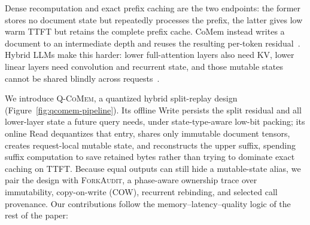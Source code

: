 \documentclass{article}
\newcommand{\qcomem}{\textsc{Q-CoMem}}
\newcommand{\method}{\textsc{ForkAudit}}
\begin{document}
Dense recomputation and exact prefix caching are the two endpoints: the former
stores no document state but repeatedly processes the prefix, the latter gives
low warm TTFT but retains the complete prefix cache.  CoMem instead writes a
document to an intermediate depth and reuses the resulting per-token
residual~\citep{liu2026comem,liu2026understanding}.  Hybrid LLMs make this
harder: lower full-attention layers also need KV, lower linear layers need
convolution and recurrent state, and those mutable states cannot be shared
blindly across requests~\citep{yang2025gateddeltanet,lieber2025jamba}.

We introduce \qcomem{}, a quantized hybrid split-replay design
(Figure~\ref{fig:qcomem-pipeline}). Its offline Write persists the split
residual and all lower-layer state a future query needs, under state-type-aware
low-bit packing; its online Read dequantizes that entry, shares only immutable
document tensors, creates request-local mutable state, and reconstructs the
upper suffix, spending suffix computation to save retained bytes rather than
trying to dominate exact caching on TTFT. Because equal outputs can still hide
a mutable-state alias, we pair the design with \method{}, a phase-aware
ownership trace over immutability, copy-on-write (COW), recurrent rebinding,
and selected call provenance. Our contributions follow the
memory--latency--quality logic of the rest of the paper:
\end{document}
